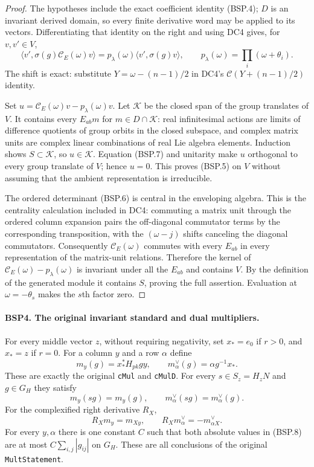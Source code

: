 \documentclass[11pt,a4paper]{article}
\numberwithin{equation}{section}
\theoremstyle{remark}\newtheorem{remark}[theorem]{Remark}
\begin{document}
\begin{proof}
The hypotheses include the exact coefficient identity (BSP.4);
$D$ is an invariant derived domain, so every finite derivative word
may be applied to its vectors.  Differentiating that identity on the
right and using DC4 gives, for $v,v'\in V$,
\[
 \langle v',\sigma(g)\mathcal C_E(\omega)v\rangle
   =p_\lambda(\omega)\langle v',\sigma(g)v\rangle,\qquad
 p_\lambda(\omega)=\prod_i(\omega+\theta_i).
 \tag{BSP.7}
\]
The shift is exact: substitute $Y=\omega-(n-1)/2$ in DC4's
$\mathcal C(Y+(n-1)/2)$ identity.

Set $u=\mathcal C_E(\omega)v-p_\lambda(\omega)v$.
Let $\mathcal K$ be the closed span of the group translates of $V$.
It contains every $E_{ab}m$ for $m\in D\cap\mathcal K$:
real infinitesimal actions are limits of difference quotients of group
orbits in the closed subspace, and complex matrix units are complex
linear combinations of real Lie algebra elements.  Induction shows
$S\subset\mathcal K$, so $u\in\mathcal K$.
Equation (BSP.7) and unitarity make $u$ orthogonal to every group
translate of $V$; hence $u=0$.  This proves (BSP.5) on $V$ without
assuming that the ambient representation is irreducible.

The ordered determinant (BSP.6) is central in the enveloping algebra.
This is the centrality calculation included in DC4: commuting a matrix
unit through the ordered column expansion pairs the off-diagonal
commutator terms by the corresponding transposition, with the
$(\omega-j)$ shifts canceling the diagonal commutators.  Consequently
$\mathcal C_E(\omega)$ commutes with every $E_{ab}$ in every
representation of the matrix-unit relations.  Therefore the kernel of
$\mathcal C_E(\omega)-p_\lambda(\omega)$ is invariant under all the
$E_{ab}$ and contains $V$.  By the definition of the generated module
it contains $S$, proving the full assertion.  Evaluation at
$\omega=-\theta_s$ makes the $s$th factor zero.
\end{proof}

\paragraph{BSP4. The original invariant standard and dual multipliers.}
\label{claim:BSP4}
For every middle vector $z$, without requiring negativity, set
$x_* = e_0$ if $r>0$, and $x_*=z$ if $r=0$.
For a column $y$ and a row $\alpha$ define
\[
 m_y(g)=x_*^*H_{pk}gy,\qquad
 m^\vee_\alpha(g)=\alpha g^{-1}x_*.
 \tag{BSP.8}
\]
These are exactly the original \texttt{c\allowbreak Mul} and \texttt{c\allowbreak Mul\allowbreak D}.
For every $s\in S_z=H_zN$ and $g\in G_H$ they satisfy
\[
 m_y(sg)=m_y(g),\qquad m^\vee_\alpha(sg)=m^\vee_\alpha(g).
 \tag{BSP.9}
\]
For the complexified right derivative $R_X$,
\[
 R_Xm_y=m_{Xy},\qquad
 R_Xm^\vee_\alpha=-m^\vee_{\alpha X}.
 \tag{BSP.10}
\]
For every $y,\alpha$ there is one constant $C$ such that both absolute
values in (BSP.8) are at most $C\sum_{i,j}|g_{ij}|$ on $G_H$.
These are all conclusions of the original \texttt{Mult\allowbreak Statement}.
\end{document}
